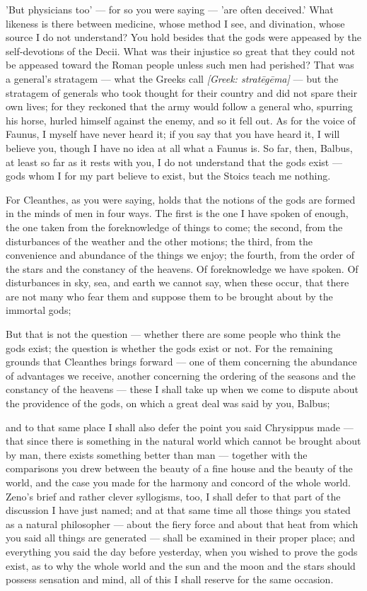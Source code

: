  'But physicians too' — for so you were saying — 'are often deceived.' What likeness is there between medicine, whose method I see, and divination, whose source I do not understand? You hold besides that the gods were appeased by the self-devotions of the Decii. What was their injustice so great that they could not be appeased toward the Roman people unless such men had perished? That was a general's stratagem — what the Greeks call \textit{[Greek: stratēgēma]} — but the stratagem of generals who took thought for their country and did not spare their own lives; for they reckoned that the army would follow a general who, spurring his horse, hurled himself against the enemy, and so it fell out. As for the voice of Faunus, I myself have never heard it; if you say that you have heard it, I will believe you, though I have no idea at all what a Faunus is. So far, then, Balbus, at least so far as it rests with you, I do not understand that the gods exist — gods whom I for my part believe to exist, but the Stoics teach me nothing.

 For Cleanthes, as you were saying, holds that the notions of the gods are formed in the minds of men in four ways. The first is the one I have spoken of enough, the one taken from the foreknowledge of things to come; the second, from the disturbances of the weather and the other motions; the third, from the convenience and abundance of the things we enjoy; the fourth, from the order of the stars and the constancy of the heavens. Of foreknowledge we have spoken. Of disturbances in sky, sea, and earth we cannot say, when these occur, that there are not many who fear them and suppose them to be brought about by the immortal gods;

 But that is not the question — whether there are some people who think the gods exist; the question is whether the gods exist or not. For the remaining grounds that Cleanthes brings forward — one of them concerning the abundance of advantages we receive, another concerning the ordering of the seasons and the constancy of the heavens — these I shall take up when we come to dispute about the providence of the gods, on which a great deal was said by you, Balbus;

 and to that same place I shall also defer the point you said Chrysippus made — that since there is something in the natural world which cannot be brought about by man, there exists something better than man — together with the comparisons you drew between the beauty of a fine house and the beauty of the world, and the case you made for the harmony and concord of the whole world. Zeno's brief and rather clever syllogisms, too, I shall defer to that part of the discussion I have just named; and at that same time all those things you stated as a natural philosopher — about the fiery force and about that heat from which you said all things are generated — shall be examined in their proper place; and everything you said the day before yesterday, when you wished to prove the gods exist, as to why the whole world and the sun and the moon and the stars should possess sensation and mind, all of this I shall reserve for the same occasion.

